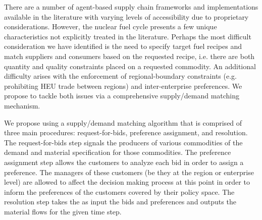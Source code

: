 
There are a number of agent-based supply chain frameworks and 
implementations available in the literature with varying levels of 
accessibility due to proprietary considerations.\cite{swaminathan_modeling_1998}\cite{julka_agent-based_2002}\cite{van_der_zee_modeling_2005}\cite{chatfield_multi-formalism_2007}
However, the nuclear fuel cycle presents a few unique characteristics not explicitly 
treated in the literature. Perhaps the most difficult consideration 
we have identified is the need to specify target fuel recipes and
match suppliers and consumers based on the requested recipe, i.e. 
there are both quantity and quality constraints placed on a requested 
commodity. An additional difficulty arises with the enforcement of 
regional-boundary constraints (e.g. prohibiting HEU trade between 
regions) and inter-enterprise preferences. We propose to tackle both 
issues via a comprehensive supply/demand matching mechanism.

We propose using a supply/demand matching algorithm that is comprised 
of three main procedures: request-for-bids, preference assignment, 
and resolution. The request-for-bids step signals the producers of 
various commodities of the demand and material specification for 
those commodities. The preference assignment step allows the customers
to analyze each bid in order to assign a preference. The managers of 
these customers (be they at the region or enterprise level) are 
allowed to affect the decision making process at this point in order 
to inform the preferences of the customers covered by their policy 
space. The resolution step takes the as input the bids and 
preferences and outputs the material flows for the given time step.\cite{cyclus2012}
